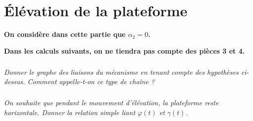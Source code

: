 \documentclass[10pt,oneside]{article}
\begin{document}




\section{Élévation de la plateforme}

\textbf{On considère dans cette partie que $\alpha_{2}=0$.}

\textbf{Dans les calculs suivants, on ne tiendra pas compte des pièces 3 et 4.}

\subparagraph{}
\textit{Donner le graphe des liaisons du mécanisme en tenant compte des hypothèses ci-dessus. Comment appelle-t-on ce type de chaîne ?}

\subparagraph{}
\textit{On souhaite que pendant le mouvement d'élévation, la plateforme reste horizontale. Donner la relation simple liant $\varphi(t)$ et $\gamma(t)$.}
\end{document}
